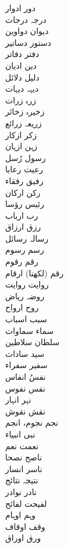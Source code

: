 \documentclass[a4paper]{article}
\begin{document}
\begin{multicols}{3}
\begin{tabbing}
دور \> ادوار\\
درجہ \> درجات\\
دیوان \> دواوین\\
دستور \> دساتیر\\
دفتر \> دفاتر\\
دین \> ادیان\\
دلیل \> دلائل\\
دیہہ \> دیہات\\
زرہ \> زرات\\
زخیرہ \> زخائر\\
زریعہ \> زرائع\\
زکر \> ازکار\\
زہن \> ازہان\\
رسول \> رُسل\\
رعیت \> رعایا\\
رفیق \> رفقاء\\
رکن \> ارکان\\
رئیس \> رؤسا\\
رب \> ارباب\\
رزق \> ارزاق\\
رسالہ \> رسائل\\
رسم \> رسوم\\
رقم \> رقوم\\
رقم (لکھنا) \> ارقام\\
روایت \> روایت\\
روضہ \> ریاض\\
روح \> ارواح\\
سبب \> اسباب\\
سماء \> سماوات\\
سلطان \> سلاطین\\
سید \> سادات\\
سفیر \> سفراء\\
نفسُ \> انفاس\\
نفس \> نفوس\\
نہر \> انہار\\
نقش \> نقوش\\
نجم \> نجوم، انجم\\
نبی \> انبیاء\\
نعمت \> نعم\\
ناصح \> نصحا\\
ناسر \> انسار\\
نتیجہ \> نتائج\\
نادر \> نوادر\\
لفیحت \> لفائح\\
وہم \> اوہام\\
وقف \> اوقاف\\
ورق \> اوراق\\

\end{tabbing}
\end{multicols}
\end{document}
